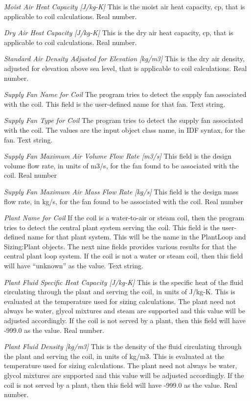 \emph{Moist Air Heat Capacity [J/kg-K]}  This is the moist air heat capacity, cp, that is applicable to coil calculations. Real number.

\emph{Dry Air Heat Capacity [J/kg-K]}  This is the dry air heat capacity, cp, that is applicable to coil calculations. Real number.

\emph{Standard Air Density Adjusted for Elevation [kg/m3]}  This is the dry air density, adjusted for elevation above sea level, that is applicable to coil calculations. Real number.

\emph{Supply Fan Name for Coil} The program tries to detect the supply fan associated with the coil.  This field is the user-defined name for that fan. Text string.

\emph{Supply Fan Type for Coil} The program tries to detect the supply fan associated with the coil. The values are the input object class name, in IDF syntax, for the fan.  Text string.

\emph{Supply Fan Maximum Air Volume Flow Rate [m3/s]}  This field is the design volume flow rate, in units of m3/s, for the fan found to be associated with the coil.  Real number

\emph{Supply Fan Maximum Air Mass Flow Rate [kg/s]} This field is the design mass flow rate, in kg/s, for the fan found to be associated with the coil. Real number

\emph{Plant Name for Coil} If the coil is a water-to-air or steam coil, then the program tries to detect the central plant system serving the coil. This field is the user-defined name for that plant system.  This will be the name in the PlantLoop and Sizing:Plant objects.  The next nine fields provides various results for that the central plant loop system.  If the coil is not a water or steam coil, then this field will have ``unknown'' as the value.  Text string.

\emph{Plant Fluid Specific Heat Capacity [J/kg-K]}  This is the specific heat of the fluid circulating through the plant and serving the coil, in units of J/kg-K.  This is evaluated at the temperature used for sizing calculations. The plant need not always be water, glycol mixtures and steam are supported and this value will be adjusted accordingly.  If the coil is not served by a plant, then this field will have -999.0 as the value. Real number.

\emph{Plant Fluid Density [kg/m3]} This is the density of the fluid circulating through the plant and serving the coil, in units of kg/m3.  This is evaluated at the temperature used for sizing calculations. The plant need not always be water, glycol mixtures are supported and this value will be adjusted accordingly.  If the coil is not served by a plant, then this field will have -999.0 as the value.  Real number.

